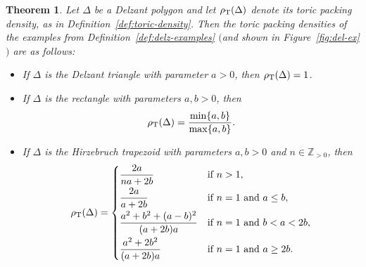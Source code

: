 \documentclass[10pt,a4paper]{amsart}
\numberwithin{equation}{section}
\newtheorem{Theorem}{Theorem}[section]
\def\Z{{\mathbb Z}}
\newcommand{\De}{\Delta}
\theoremstyle{definition}
\theoremstyle{plain}
\theoremstyle{plain}
\begin{document}
\begin{Theorem}\label{thm:toric-examples}
 Let $\De$ be a Delzant polygon and let $\rho_{{\rm T}}(\De)$ denote its toric packing density, as in Definition~{\rm \ref{def:toric-density}}. Then the toric packing densities of the examples from Definition~{\rm \ref{def:delz-examples}} $($and shown in Figure~{\rm \ref{fig:del-ex}}$)$ are as follows:
 \begin{itemize}\itemsep=0pt
 \item If $\De$ is the Delzant triangle with parameter $a>0$, then $\rho_{{\rm T}}(\De) = 1$.
 \item If $\De$ is the rectangle with parameters $a,b>0$, then \[\rho_{{\rm T}}(\De) = \frac{\min \{a,b\}}{\max\{a,b\}}.\]
 \item If $\De$ is the Hirzebruch trapezoid with parameters $a,b>0$ and $n\in\Z_{>0}$, then
 \begin{equation*}
 \rho_{{\rm T}}(\De) = \begin{cases}
 \dfrac{2a}{na+2b} & \text{if }n>1,\vspace{1mm}\\
 \dfrac{2a}{a+2b} & \text{if }n=1 \text{ and }a\leq b,\vspace{1mm}\\
 \dfrac{a^2+b^2+ (a-b)^2}{(a+2b)a} & \text{if }n=1 \text{ and } b < a < 2b,\vspace{1mm}\\
 \dfrac{a^2+2b^2}{(a+2b)a} & \text{if }n=1 \text{ and } a \geq 2b. \end{cases}
\end{equation*}
 \end{itemize}
\end{Theorem}
\end{document}
